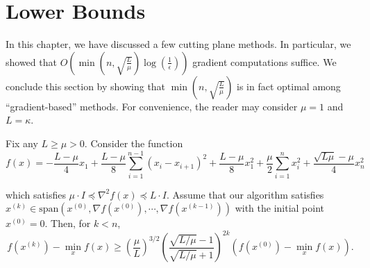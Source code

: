 %

\section{Lower Bounds\label{sec:Lower-Bounds}}

In this chapter, we have discussed a few cutting plane methods. In
particular, we showed that $O(\min(n,\sqrt{\frac{L}{\mu}})\log(\frac{1}{\epsilon}))$
gradient computations suffice. We conclude this section by showing
that $\min(n,\sqrt{\frac{L}{\mu}})$ is in fact optimal among ``gradient-based''
methods. For convenience, the reader may consider $\mu=1$ and $L=\kappa$.
\begin{thm}
Fix any $L\geq\mu>0$. Consider the function
\begin{equation}
f(x)=-\frac{L-\mu}{4}x_{1}+\frac{L-\mu}{8}\sum^{n-1}_{i=1}(x_{i}-x_{i+1})^{2}+\frac{L-\mu}{8}x^{2}_{1}+\frac{\mu}{2}\sum^{n}_{i=1}x^{2}_{i}+\frac{\sqrt{L\mu}-\mu}{4}x^{2}_{n}\label{eq:worst_function}
\end{equation}

which satisfies $\mu\cdot I\preceq\nabla^{2}f(x)\preceq L\cdot I$.
Assume that our algorithm satisfies $x^{(k)}\in\mathrm{span}(x^{(0)},\nabla f(x^{(0)}),\cdots,\nabla f(x^{(k-1)}))$
with the initial point $x^{(0)}=0$. Then, for $k<n$,
\[
f(x^{(k)})-\min_{x}f(x)\geq(\frac{\mu}{L})^{3/2}(\frac{\sqrt{L/\mu}-1}{\sqrt{L/\mu}+1})^{2k}(f(x^{(0)})-\min_{x}f(x)).
\]
\end{thm}

